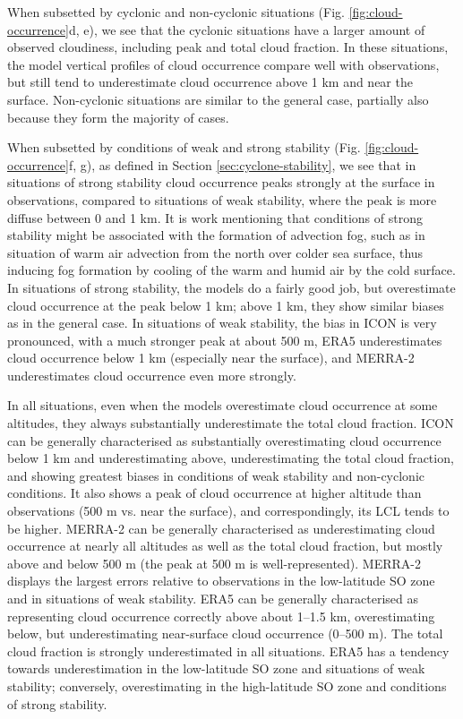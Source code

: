 \documentclass[12pt,a4paper]{article}
\begin{document}
When subsetted by cyclonic and non-cyclonic situations (Fig.
\ref{fig:cloud-occurrence}d, e), we see that the cyclonic situations have a
larger amount of observed cloudiness, including peak and total cloud fraction.
In these situations, the model vertical profiles of cloud occurrence compare
well with observations, but still tend to underestimate cloud occurrence above
1 km and near the surface. Non-cyclonic situations are similar to the general
case, partially also because they form the majority of cases.

When subsetted by conditions of weak and strong stability (Fig.
\ref{fig:cloud-occurrence}f, g), as defined in Section
\ref{sec:cyclone-stability}, we see that in situations of strong stability
cloud occurrence peaks strongly at the surface in observations, compared to
situations of weak stability, where the peak is more diffuse between 0 and 1
km.  It is work mentioning that conditions of strong stability might be
associated with the formation of advection fog, such as in situation of warm
air advection from the north over colder sea surface, thus inducing fog
formation by cooling of the warm and humid air by the cold surface.  In
situations of strong stability, the models do a fairly good job, but
overestimate cloud occurrence at the peak below 1 km; above 1 km, they show
similar biases as in the general case.  In situations of weak stability, the
bias in ICON is very pronounced, with a much stronger peak at about 500 m, ERA5
underestimates cloud occurrence below 1 km (especially near the surface), and
MERRA-2 underestimates cloud occurrence even more strongly.

In all situations, even when the models overestimate cloud occurrence at some
altitudes, they always substantially underestimate the total cloud fraction.
ICON can be generally characterised as substantially overestimating cloud
occurrence below 1 km and underestimating above, underestimating the total
cloud fraction, and showing greatest biases in conditions of weak stability and
non-cyclonic conditions. It also shows a peak of cloud occurrence at higher
altitude than observations (500 m vs. near the surface), and correspondingly,
its LCL tends to be higher. MERRA-2 can be generally characterised as
underestimating cloud occurrence at nearly all altitudes as well as the total
cloud fraction, but mostly above and below 500 m (the peak at 500 m is
well-represented). MERRA-2 displays the largest errors relative to observations
in the low-latitude SO zone and in situations of weak stability. ERA5 can be
generally characterised as representing cloud occurrence correctly above about
1--1.5 km, overestimating below, but underestimating near-surface cloud
occurrence (0--500 m). The total cloud fraction is strongly underestimated in
all situations. ERA5 has a tendency towards underestimation in the low-latitude
SO zone and situations of weak stability; conversely, overestimating in the
high-latitude SO zone and conditions of strong stability.
\end{document}
